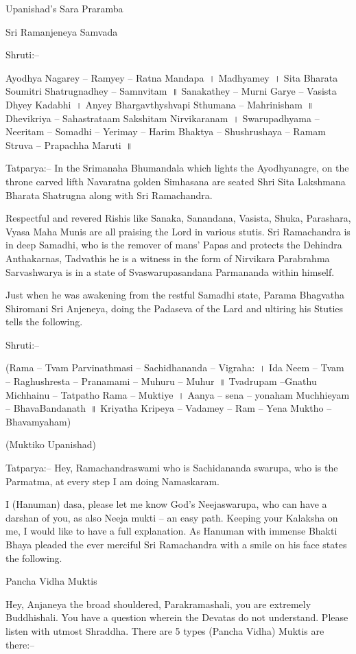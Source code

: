 
Upanishad's Sara Praramba

Sri Ramanjeneya Samvada

Shruti:–

Ayodhya Nagarey – Ramyey – Ratna Mandapa~। Madhyamey~। Sita Bharata Soumitri Shatrugnadhey – Samnvitam~॥ Sanakathey – Murni Garye – Vasista Dhyey Kadabhi~। Anyey Bhargavthyshvapi Sthumana – Mahrinisham~॥ Dhevikriya – Sahastrataam Sakshitam Nirvikaranam~। Swarupadhyama – Neeritam – Somadhi – Yerimay – Harim Bhaktya – Shushrushaya – Ramam Struva – Prapachha Maruti~॥

Tatparya:– In the Srimanaha Bhumandala which lights the Ayodhyanagre, on the throne carved lifth Navaratna golden Simhasana are seated Shri Sita Lakshmana Bharata Shatrugna along with Sri Ramachandra.

Respectful and revered Rishis like Sanaka, Sanandana, Vasista, Shuka, Parashara, Vyasa Maha Munis are all praising the Lord in various stutis. Sri Ramachandra is in deep Samadhi, who is the remover of mans' Papas and protects the Dehindra Anthakarnas, Tadvathis he is a witness in the form of Nirvikara Parabrahma Sarvashwarya is in a state of Svaswarupasandana Parmananda within himself.

Just when he was awakening from the restful Samadhi state, Parama Bhagvatha Shiromani Sri Anjeneya, doing the Padaseva of the Lard and ultiring his Stuties tells the following.

Shruti:–

(Rama – Tvam Parvinathmasi – Sachidhananda – Vigraha:~। Ida Neem – Tvam – Raghushresta – Pranamami – Muhuru – Muhur~॥ Tvadrupam –Gnathu Michhainu – Tatpatho Rama – Muktiye~। Aanya – sena – yonaham Muchhieyam – BhavaBandanath~॥ Kriyatha Kripeya – Vadamey – Ram – Yena Muktho – Bhavamyaham)

(Muktiko Upanishad)

Tatparya:– Hey, Ramachandraswami who is Sachidananda swarupa, who is the Parmatma, at every step I am doing Namaskaram.

I (Hanuman) dasa, please let me know God's Neejaswarupa, who can have a darshan of you, as also Neeja mukti – an easy path. Keeping your Kalaksha on me, I would like to have a full explanation. As Hanuman with immense Bhakti Bhaya pleaded the ever merciful Sri Ramachandra with a smile on his face states the following.

Pancha Vidha Muktis

Hey, Anjaneya the broad shouldered, Parakramashali, you are extremely Buddhishali. You have a question wherein the Devatas do not understand. Please listen with utmost Shraddha. There are 5 types (Pancha Vidha) Muktis are there:–

